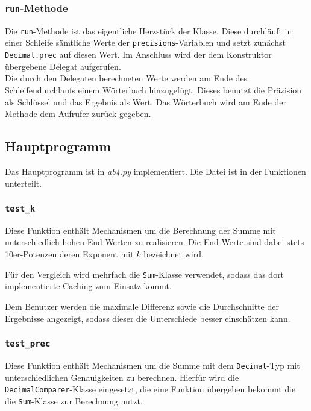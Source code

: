 \documentclass{article}
\begin{document}
	\subsubsection{\texttt{run}-Methode}
	
		Die \verb|run|-Methode ist das eigentliche Herzstück der Klasse. Diese durchläuft in einer Schleife sämtliche Werte der \verb|precisions|-Variablen und setzt zunächst \verb|Decimal.prec| auf diesen Wert. Im Anschluss wird der dem Konstruktor übergebene Delegat aufgerufen.\\
		Die durch den Delegaten berechneten Werte werden am Ende des Schleifendurchlaufs einem Wörterbuch hinzugefügt. Dieses benutzt die Präzision als Schlüssel und das Ergebnis als Wert. Das Wörterbuch wird am Ende der Methode dem Aufrufer zurück gegeben.
	
	\subsection{Hauptprogramm}
	
		Das Hauptprogramm ist in \emph{ab4.py} implementiert. Die Datei ist in der Funktionen unterteilt.
	
	\subsubsection{\texttt{test\_k}}
	
		Diese Funktion enthält Mechanismen um die Berechnung der Summe mit unterschiedlich hohen End-Werten zu realisieren. Die End-Werte sind dabei stets 10er-Potenzen deren Exponent mit $k$ bezeichnet wird.
		
		Für den Vergleich wird mehrfach die \verb|Sum|-Klasse verwendet, sodass das dort implementierte Caching zum Einsatz kommt.
		
		Dem Benutzer werden die maximale Differenz sowie die Durchschnitte der Ergebnisse angezeigt, sodass dieser die Unterschiede besser einschätzen kann.
	
	\subsubsection{\texttt{test\_prec}}
	
		Diese Funktion enthält Mechanismen um die Summe mit dem \verb|Decimal|-Typ mit unterschiedlichen Genauigkeiten zu berechnen. Hierfür wird die \verb|DecimalComparer|-Klasse eingesetzt, die eine Funktion übergeben bekommt die die \verb|Sum|-Klasse zur Berechnung nutzt.
				
\end{document}
